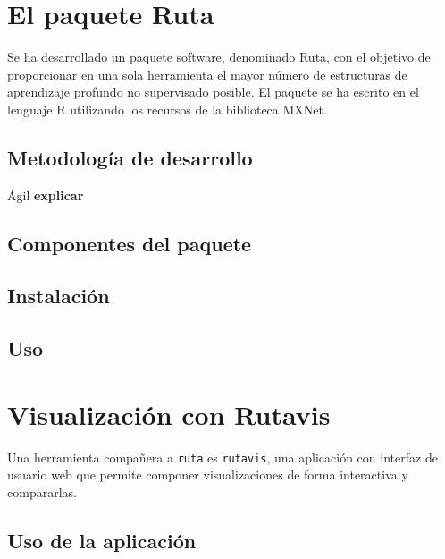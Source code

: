 \section{El paquete Ruta}\label{el-paquete-ruta}

Se ha desarrollado un paquete software, denominado Ruta, con el
objetivo de proporcionar en una sola herramienta el mayor número de
estructuras de aprendizaje profundo no supervisado posible. El paquete se ha escrito en el lenguaje R utilizando los recursos de la biblioteca MXNet.

\subsection{Metodología de
desarrollo}\label{metodologuxeda-de-desarrollo}

Ágil \textbf{explicar}

\subsection{Componentes del paquete}\label{componentes-del-paquete}

\subsection{Instalación}

\subsection{Uso}

\section{Visualización con Rutavis}\label{visualizaciuxf3n-rutavis}

Una herramienta compañera a \texttt{ruta} es \texttt{rutavis}, una
aplicación con interfaz de usuario web que permite componer
visualizaciones de forma interactiva y compararlas.

\subsection*{Uso de la aplicación}\label{uso-de-la-aplicaciuxf3n}
